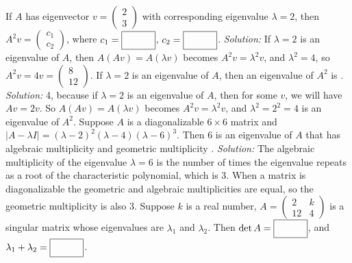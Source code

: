 \begin{parts}
{        } \fi    
    \fi 

    \ifnum {}
        If $A$ has eigenvector $v = \begin{pmatrix} 2\\3 \end{pmatrix}$ with corresponding eigenvalue $\lambda = 2$, then $A^2v = \begin{pmatrix} c_1\\c_2\end{pmatrix}$, where $c_1 = \framebox{\strut\hspace{1cm}}$, $c_2 = \framebox{\strut\hspace{1cm}}$. 
        \ifnum {} {\color{DarkBlue} \textit{Solution:} If $\lambda = 2$ is an eigenvalue of $A$, then $A(Av) = A(\lambda v)$ becomes $A^2v = \lambda^2v$, and $\lambda^2 = 4$, so $A^2v = 4 v = \begin{pmatrix} 8\\12\end{pmatrix}$.   } \fi    
    \fi 
    \ifnum {}
        If $\lambda = 2$ is an eigenvalue of $A$, then an eigenvalue of $A^2$ is \framebox{\strut\hspace{1cm}}. 
        \ifnum {} {\color{DarkBlue} \textit{Solution:} 4, because if $\lambda = 2$ is an eigenvalue of $A$, then for some $v$, we will have $Av=2v$. So $A(Av) = A(\lambda v)$ becomes $A^2v = \lambda^2v$, and $\lambda^2 = 2^2=4$ is an eigenvalue of $A^2$.  } \fi    
    \fi     
    \ifnum {}
        Suppose $A$ is a diagonalizable $6\times 6$ matrix and $\left|A - \lambda I\right| =  (\lambda -2)^2(\lambda-4)(\lambda-6)^3$. Then $6$ is an eigenvalue of $A$ that has algebraic multiplicity \framebox{\strut\hspace{1cm}} and geometric multiplicity \framebox{\strut\hspace{1cm}}.  
        \ifnum {} {\color{DarkBlue} \textit{Solution:} The algebraic multiplicity of the eigenvalue $\lambda = 6$ is the number of times the eigenvalue repeats as a root of the characteristic polynomial, which is 3. When a matrix is diagonalizable the geometric and algebraic multiplicities are equal, so the geometric multiplicity is also 3.  } \fi      
    \fi 
    \ifnum {}
        Suppose $k$ is a real number, $A = \begin{pmatrix} 2&k\\12&4\end{pmatrix}$ is a singular matrix whose eigenvalues are $\lambda_1$ and $\lambda_2$. Then $\det A = \framebox{\strut\hspace{1cm}}$, and $\lambda_1 + \lambda_2 = \framebox{\strut\hspace{1cm}}$. 

\end{parts}
